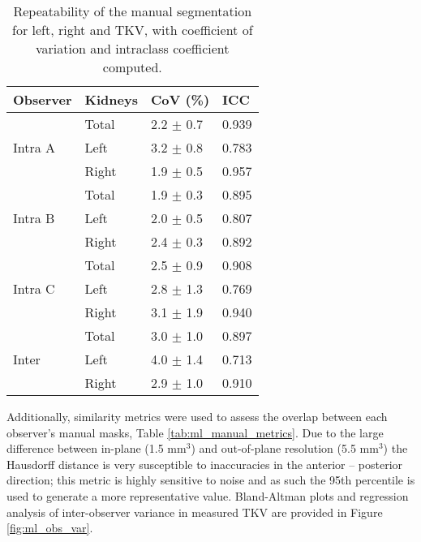 \begin{table}[H]
	\centering
	\begin{tabular}{ll||l|l}
		Observer                 & Kidneys & CoV (\%)      & ICC   \\ \hline
		\multirow{3}{*}{Intra A} & Total   & 2.2 $\pm$ 0.7 & 0.939 \\ \cline{2-4} 
		& Left    & 3.2 $\pm$ 0.8 & 0.783 \\ \cline{2-4} 
		& Right   & 1.9 $\pm$ 0.5 & 0.957 \\ \hline
		\multirow{3}{*}{Intra B} & Total   & 1.9 $\pm$ 0.3 & 0.895 \\ \cline{2-4} 
		& Left    & 2.0 $\pm$ 0.5 & 0.807 \\ \cline{2-4} 
		& Right   & 2.4 $\pm$ 0.3 & 0.892 \\ \hline
		\multirow{3}{*}{Intra C} & Total   & 2.5 $\pm$ 0.9 & 0.908 \\ \cline{2-4} 
		& Left    & 2.8 $\pm$ 1.3 & 0.769 \\ \cline{2-4} 
		& Right   & 3.1 $\pm$ 1.9 & 0.940 \\ \hline
		\multirow{3}{*}{Inter}   & Total   & 3.0 $\pm$ 1.0 & 0.897 \\ \cline{2-4} 
		& Left    & 4.0 $\pm$ 1.4 & 0.713 \\ \cline{2-4} 
		& Right   & 2.9 $\pm$ 1.0 & 0.910
	\end{tabular}
	\caption{Repeatability of the manual segmentation for left, right and \ac{TKV}, with coefficient of variation and intraclass coefficient computed.}
	\label{tab:ml_manual_repeatability}
\end{table}

Additionally, similarity metrics were used to assess the overlap between each observer’s manual masks, Table \ref{tab:ml_manual_metrics}. Due to the large difference between in-plane (1.5 mm$^3$) and out-of-plane resolution (5.5 mm$^3$) the Hausdorff distance is very susceptible to inaccuracies in the anterior – posterior direction; this metric is highly sensitive to noise and as such the 95th percentile is used to generate a more representative value. Bland-Altman plots and regression analysis of inter-observer variance in measured \ac{TKV} are provided in Figure \ref{fig:ml_obs_var}.

